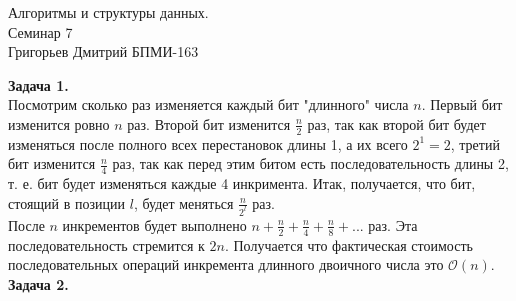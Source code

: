 \documentclass[12pt,a4paper]{scrartcl}
\begin{document}
	\begin{center}	
		Алгоритмы и структуры данных. \\
		Семинар 7 \\
		Григорьев Дмитрий БПМИ-163\\
	\end{center}
	\textbf{Задача 1.} \\
	Посмотрим сколько раз изменяется каждый бит "длинного" числа $n$.
	Первый бит изменится ровно $n$ раз. Второй бит изменится $\frac{n}{2}$ раз, так как второй бит будет изменяться после полного  всех перестановок длины 1, а их всего $2^1 = 2$, третий бит изменится $\frac{n}{4}$ раз, так как перед этим битом есть последовательность длины 2, т. е. бит будет изменяться каждые 4 инкримента. Итак, получается, что бит, стоящий в позиции $l$, будет меняться $\frac{n}{2^{l}}$ раз.\\
	После $n$ инкрементов будет выполнено $n + \frac{n}{2} + \frac{n}{4} + \frac{n}{8} + ...$ раз. Эта последовательность стремится к $2n$. Получается что фактическая стоимость последовательных операций инкремента длинного двоичного числа это  $\mathcal{O}(n)$. \\
	
	\noindent
	\textbf{Задача 2.} \\
	
\end{document}
